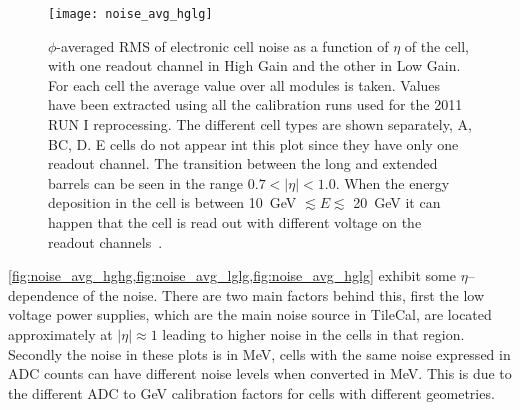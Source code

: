 \begin{figure}[!h]
  \centering
    \texttt{[image: noise\_avg\_hglg]}
    \caption{$\phi$-averaged RMS of electronic cell noise as a function of
      $\eta$ of the cell, with one readout channel in High Gain and the other in
      Low Gain. For each cell the average value over all modules is
      taken. Values have been extracted using all the calibration runs used for
      the 2011 RUN I reprocessing. The different cell types are shown
      separately, A, BC, D. E cells do not appear int this plot since they have
      only one readout channel. The transition between the long and extended
      barrels can be seen in the range $0.7 < |\eta| < 1.0$. When the energy
      deposition in the cell is between 10~GeV $\lesssim E \lesssim$ 20~GeV it
      can happen that the cell is read out with different voltage on the readout
      channels~\cite{MyTileCalPlots}.}
    \label{fig:noise_avg_hglg}
\end{figure}

\cref{fig:noise_avg_hghg,fig:noise_avg_lglg,fig:noise_avg_hglg} exhibit some
$\eta$--dependence of the noise. There are two main factors behind this, first
the low voltage power supplies, which are the main noise source in TileCal, are
located approximately at $|\eta| \approx 1$ leading to higher noise in the cells
in that region. Secondly the noise in these plots is in MeV, cells with the same
noise expressed in ADC counts can have different noise levels when converted in
MeV. This is due to the different ADC to GeV calibration factors for cells with
different geometries.
